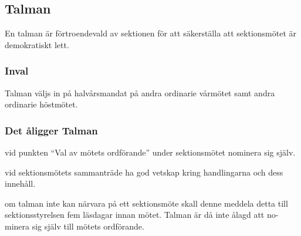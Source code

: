 \subsection{Talman}
En talman är förtroendevald av sektionen för att säkerställa att sektionsmötet är demokratiskt lett. 

\subsubsection{Inval}
Talman väljs in på halvårsmandat på andra ordinarie vårmötet samt andra ordinarie höstmötet.
\subsubsection{Det åligger Talman}
\begin{att}
  \item vid punkten ``Val av mötets ordförande'' under sektionsmötet nominera sig själv.
  \item vid sektionsmötets sammanträde ha god vetskap kring handlingarna och dess innehåll.
  \item om talman inte kan närvara på ett sektionsmöte skall denne meddela detta till sektionsstyrelsen fem läsdagar innan mötet. Talman är då inte ålagd att no-minera sig själv till mötets ordförande.
\end{att}